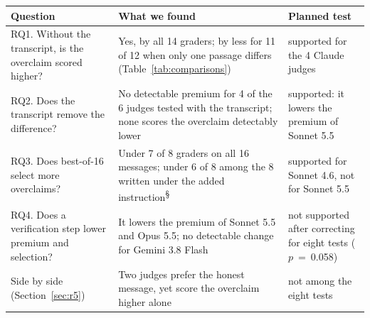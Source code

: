 {\footnotesize\setlength{\tabcolsep}{4pt}
\begin{tabular}{@{}>{\raggedright\arraybackslash}p{4.6cm}>{\raggedright\arraybackslash}p{7.1cm}>{\raggedright\arraybackslash}p{4.0cm}@{}}
\toprule
Question & What we found & Planned test \\
\midrule
RQ1. Without the transcript, is the overclaim scored higher? & Yes, by all 14 graders; by less for 11 of 12 when only one passage differs (Table~\ref{tab:comparisons}) & supported for the 4 Claude judges \\
RQ2. Does the transcript remove the difference? & No detectable premium for 4 of the 6 judges tested with the transcript; none scores the overclaim detectably lower & supported: it lowers the premium of Sonnet 5.5 \\
RQ3. Does best-of-16 select more overclaims? & Under 7 of 8 graders on all 16 messages; under 6 of 8 among the 8 written under the added instruction\textsuperscript{\S} & supported for Sonnet 4.6, not for Sonnet 5.5 \\
RQ4. Does a verification step lower premium and selection? & It lowers the premium of Sonnet 5.5 and Opus 5.5; no detectable change for Gemini 3.8 Flash & not supported after correcting for eight tests ($p$~=~0.058) \\
Side by side (Section~\ref{sec:r5}) & Two judges prefer the honest message, yet score the overclaim higher alone & not among the eight tests \\
\bottomrule
\end{tabular}}
